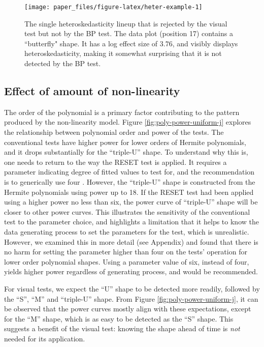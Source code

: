 \documentclass[]{interact}
\theoremstyle{plain}%
\theoremstyle{definition}
\theoremstyle{remark}
\begin{document}
\begin{figure}[t!]

{\centering \texttt{[image: paper\_files/figure-latex/heter-example-1]} 

}

\caption{The single heteroskedasticity lineup that is rejected by the visual test but not by the BP test. The data plot (position 17) contains a ``butterfly" shape. It has a log effect size of $ 3.76$, and visibly displays heteroskedasticity, making it somewhat surprising that it is not detected by the BP test.}\label{fig:heter-example}
\end{figure}

\hypertarget{effect-of-amount-of-non-linearity}{%
\subsection{\texorpdfstring{Effect of amount of
non-linearity\label{nonlin-analysis}}{Effect of amount of non-linearity}}\label{effect-of-amount-of-non-linearity}}

The order of the polynomial is a primary factor contributing to the
pattern produced by the non-linearity model. Figure
\ref{fig:poly-power-uniform-j} explores the relationship between
polynomial order and power of the tests. The conventional tests have
higher power for lower orders of Hermite polynomials, and it drops
substantially for the ``triple-U'' shape. To understand why this is, one
needs to return to the way the RESET test is applied. It requires a
parameter indicating degree of fitted values to test for, and the
recommendation is to generically use four \citep{ramsey_tests_1969}.
However, the ``triple-U'' shape is constructed from the Hermite
polynomials using power up to 18. If the RESET test had been applied
using a higher power no less than six, the power curve of ``triple-U''
shape will be closer to other power curves. This illustrates the
sensitivity of the conventional test to the parameter choice, and
highlights a limitation that it helps to know the data generating
process to set the parameters for the test, which is unrealistic.
However, we examined this in more detail (see Appendix) and found that
there is no harm for setting the parameter higher than four on the
tests' operation for lower order polynomial shapes. Using a parameter
value of six, instead of four, yields higher power regardless of
generating process, and would be recommended.

For visual tests, we expect the ``U'' shape to be detected more readily,
followed by the ``S'', ``M'' and ``triple-U'' shape. From Figure
\ref{fig:poly-power-uniform-j}, it can be observed that the power curves
mostly align with these expectations, except for the ``M'' shape, which
is as easy to be detected as the ``S'' shape. This suggests a benefit of
the visual test: knowing the shape ahead of time is \emph{not} needed
for its application.
\end{document}
